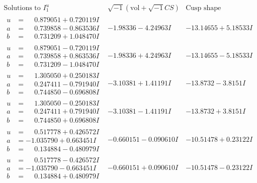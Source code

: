 \documentclass[1p]{elsarticle_modified}
\theoremstyle{definition}
\newcommand{\I}{\sqrt{-1}}
\begin{document}
$$\begin{array}{c|c|c}  
\text{Solutions to }I^u_{1}& \I (\text{vol} + \sqrt{-1}CS) & \text{Cusp shape}\\
 \hline 
\begin{aligned}
u &= \phantom{-}0.879051 + 0.720119 I \\
a &= \phantom{-}0.739858 - 0.863536 I \\
b &= \phantom{-}0.731209 + 1.048470 I\end{aligned}
 & -1.98336 - 4.24963 I & -13.14655 + 5.18533 I \\ \hline\begin{aligned}
u &= \phantom{-}0.879051 - 0.720119 I \\
a &= \phantom{-}0.739858 + 0.863536 I \\
b &= \phantom{-}0.731209 - 1.048470 I\end{aligned}
 & -1.98336 + 4.24963 I & -13.14655 - 5.18533 I \\ \hline\begin{aligned}
u &= \phantom{-}1.305050 + 0.250183 I \\
a &= \phantom{-}0.247411 - 0.791940 I \\
b &= \phantom{-}0.744850 - 0.696808 I\end{aligned}
 & -3.10381 + 1.41191 I & -13.8732 - 3.8151 I \\ \hline\begin{aligned}
u &= \phantom{-}1.305050 - 0.250183 I \\
a &= \phantom{-}0.247411 + 0.791940 I \\
b &= \phantom{-}0.744850 + 0.696808 I\end{aligned}
 & -3.10381 - 1.41191 I & -13.8732 + 3.8151 I \\ \hline\begin{aligned}
u &= \phantom{-}0.517778 + 0.426572 I \\
a &= -1.035790 + 0.663451 I \\
b &= \phantom{-}0.134884 - 0.480979 I\end{aligned}
 & -0.660151 - 0.090610 I & -10.51478 + 0.23122 I \\ \hline\begin{aligned}
u &= \phantom{-}0.517778 - 0.426572 I \\
a &= -1.035790 - 0.663451 I \\
b &= \phantom{-}0.134884 + 0.480979 I\end{aligned}
 & -0.660151 + 0.090610 I & -10.51478 - 0.23122 I \\ \hline\begin{aligned}

\end{aligned}
\end{array}$$
\end{document}
